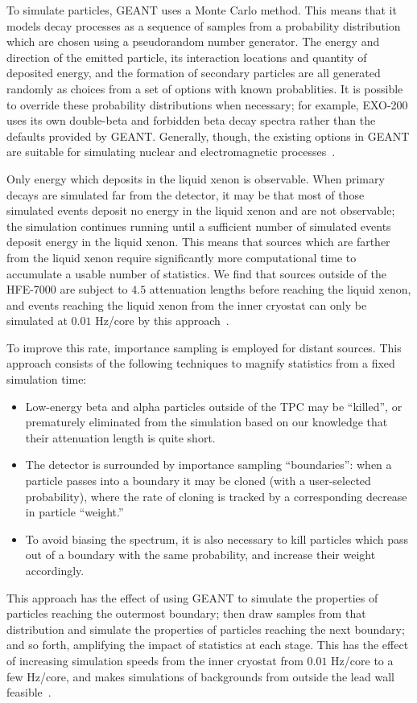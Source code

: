 To simulate particles, GEANT uses a Monte Carlo method.  This means that it models decay processes as a sequence of samples from a probability distribution which are chosen using a pseudorandom number generator.  The energy and direction of the emitted particle, its interaction locations  and quantity of deposited energy, and the formation of secondary particles are all generated randomly as choices from a set of options with known probablities.  It is possible to override these probability distributions when necessary; for example, EXO-200 uses its own double-beta and forbidden beta decay spectra rather than the defaults provided by GEANT.  Generally, though, the existing options in GEANT are suitable for simulating nuclear and electromagnetic processes~\cite{MCDocumentRun2a}.

Only energy which deposits in the liquid xenon is observable.  When primary decays are simulated far from the detector, it may be that most of those simulated events deposit no energy in the liquid xenon and are not observable; the simulation continues running until a sufficient number of simulated events deposit energy in the liquid xenon.  This means that sources which are farther from the liquid xenon require significantly more computational time to accumulate a usable number of statistics.  We find that sources outside of the HFE-7000 are subject to $4.5$ attenuation lengths before reaching the liquid xenon, and events reaching the liquid xenon from the inner cryostat can only be simulated at $0.01$ Hz/core by this approach~\cite{MCDocumentRun2a}.

To improve this rate, importance sampling is employed for distant sources.  This approach consists of the following techniques to magnify statistics from a fixed simulation time:~\cite{Dressel:642987,MCDocumentRun2a}
\begin{itemize}
\item Low-energy beta and alpha particles outside of the TPC may be ``killed'', or prematurely eliminated from the simulation based on our knowledge that their attenuation length is quite short.
\item The detector is surrounded by importance sampling ``boundaries'': when a particle passes into a boundary it may be cloned (with a user-selected probability), where the rate of cloning is tracked by a corresponding decrease in particle ``weight.''
\item To avoid biasing the spectrum, it is also necessary to kill particles which pass out of a boundary with the same probability, and increase their weight accordingly.
\end{itemize}
This approach has the effect of using GEANT to simulate the properties of particles reaching the outermost boundary; then draw samples from that distribution and simulate the properties of particles reaching the next boundary; and so forth, amplifying the impact of statistics at each stage.  This has the effect of increasing simulation speeds from the inner cryostat from $0.01$ Hz/core to a few Hz/core, and makes simulations of backgrounds from outside the lead wall feasible~\cite{MCDocumentRun2a}.

